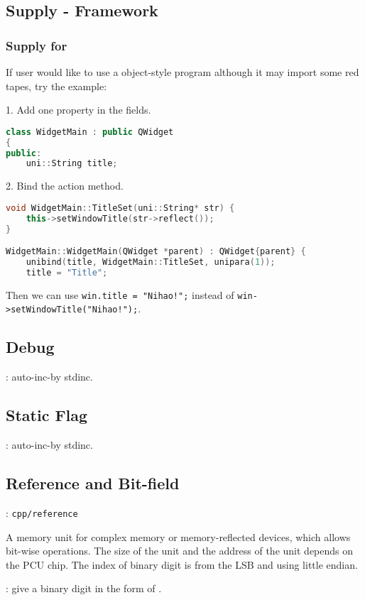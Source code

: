 \subsection{Supply \mbox{-} Framework}

\subsubsection{Supply for }

If user would like to use a object-style program although it may import some red tapes, try the example:

1. Add one property in the fields.
\begin{lstlisting}[language=C++]
class WidgetMain : public QWidget
{
public:
	uni::String title;
\end{lstlisting}

2. Bind the action method.
\begin{lstlisting}[language=C++]
void WidgetMain::TitleSet(uni::String* str) {
	this->setWindowTitle(str->reflect());
}

WidgetMain::WidgetMain(QWidget *parent) : QWidget{parent} {
	unibind(title, WidgetMain::TitleSet, unipara(1));
	title = "Title";
\end{lstlisting}

Then we can use \verb|win.title = "Nihao!";| instead of \verb|win->setWindowTitle("Nihao!");|.

\subsection{Debug}
: auto-inc-by stdinc.

\subsection{Static Flag}
: auto-inc-by stdinc.

\subsection{Reference and Bit-field}
: \verb`cpp/reference`

A memory unit for complex memory or memory-reflected devices, which allows bit-wise operations.
The size of {the unit} and {the address of the unit} depends on the PCU chip.
The index of binary digit is from the LSB and using little endian.

: give a binary digit in the form of . 

